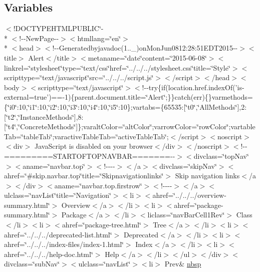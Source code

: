 \subsection*{Variables}
\begin{DoxyCompactItemize}
\item 
$<$!D\-O\-C\-T\-Y\-P\-E\-H\-T\-M\-L\-P\-U\-B\-L\-I\-C\char`\"{}-\/\\*
$<$!-\/-\/New\-Page-\/-\/$>$$<$htmllang=\char`\"{}en\char`\"{}$>$\\*
$<$head$>$$<$!-\/-\/Generatedbyjavadoc(1..\-\_)on\-Mon\-Jun0812\-:28\-:51\-E\-D\-T2015-\/-\/$>$$<$title$>$ Alert$<$/title$>$$<$metaname=\char`\"{}date\char`\"{}content=\char`\"{}2015-\/06-\/08\char`\"{}$>$$<$linkrel=\char`\"{}stylesheet\char`\"{}type=\char`\"{}text/css\char`\"{}href=\char`\"{}../../../stylesheet.\-css\char`\"{}title=\char`\"{}\-Style\char`\"{}$>$$<$scripttype=\char`\"{}text/javascript\char`\"{}src=\char`\"{}../../../script.\-js\char`\"{}$>$$<$/script$>$$<$/head$>$$<$body$>$$<$scripttype=\char`\"{}text/javascript\char`\"{}$>$$<$!-\/-\/try\{if(location.\-href.\-index\-Of('is-\/external=true')==-\/1)\{parent.\-document.\-title=\char`\"{}\-Alert\char`\"{};\}\}catch(err)\{\}varmethods=\{\char`\"{}i0\char`\"{}\-:10,\char`\"{}i1\char`\"{}\-:10,\char`\"{}i2\char`\"{}\-:10,\char`\"{}i3\char`\"{}\-:10,\char`\"{}i4\char`\"{}\-:10,\char`\"{}i5\char`\"{}\-:10\};vartabs=\{65535\-:\mbox{[}\char`\"{}t0\char`\"{},\char`\"{}\-All\-Methods\char`\"{}\mbox{]},2\-:\mbox{[}\char`\"{}t2\char`\"{},\char`\"{}\-Instance\-Methods\char`\"{}\mbox{]},8\-:\mbox{[}\char`\"{}t4\char`\"{},\char`\"{}\-Concrete\-Methods\char`\"{}\mbox{]}\};varalt\-Color=\char`\"{}alt\-Color\char`\"{};varrow\-Color=\char`\"{}row\-Color\char`\"{};vartable\-Tab=\char`\"{}table\-Tab\char`\"{};varactive\-Table\-Tab=\char`\"{}active\-Table\-Tab\char`\"{};$<$/script$>$$<$noscript$>$$<$div$>$ Java\-Script is disabled on your browser$<$/div$>$$<$/noscript$>$$<$!-\/-\/=========\-S\-T\-A\-R\-T\-O\-F\-T\-O\-P\-N\-A\-V\-B\-A\-R=======-\/-\/$>$$<$divclass=\char`\"{}top\-Nav\char`\"{}$>$$<$aname=\char`\"{}navbar.\-top\char`\"{}$>$$<$!-\/-\/-\/-\/$>$$<$/a$>$$<$divclass=\char`\"{}skip\-Nav\char`\"{}$>$$<$ahref=\char`\"{}\#skip.\-navbar.\-top\char`\"{}title=\char`\"{}\-Skipnavigationlinks\char`\"{}$>$ Skip navigation links$<$/a$>$$<$/div$>$$<$aname=\char`\"{}navbar.\-top.\-firstrow\char`\"{}$>$$<$!-\/-\/-\/-\/$>$$<$/a$>$$<$ulclass=\char`\"{}nav\-List\char`\"{}title=\char`\"{}\-Navigation\char`\"{}$>$$<$li$>$$<$ahref=\char`\"{}../../../overview-\/summary.\-html\char`\"{}$>$ Overview$<$/a$>$$<$/li$>$$<$li$>$$<$ahref=\char`\"{}package-\/summary.\-html\char`\"{}$>$ Package$<$/a$>$$<$/li$>$$<$liclass=\char`\"{}nav\-Bar\-Cell1\-Rev\char`\"{}$>$ Class$<$/li$>$$<$li$>$$<$ahref=\char`\"{}package-\/tree.\-html\char`\"{}$>$ Tree$<$/a$>$$<$/li$>$$<$li$>$$<$ahref=\char`\"{}../../../deprecated-\/list.\-html\char`\"{}$>$ Deprecated$<$/a$>$$<$/li$>$$<$li$>$$<$ahref=\char`\"{}../../../index-\/files/index-\/1.\-html\char`\"{}$>$ Index$<$/a$>$$<$/li$>$$<$li$>$$<$ahref=\char`\"{}../../../help-\/doc.\-html\char`\"{}$>$ Help$<$/a$>$$<$/li$>$$<$/ul$>$$<$/div$>$$<$divclass=\char`\"{}sub\-Nav\char`\"{}$>$$<$ulclass=\char`\"{}nav\-List\char`\"{}$>$$<$li$>$ Prev\& \hyperlink{_alert_8html_aef915316f784c9063d942974538301a6}{nbsp}

\end{DoxyCompactItemize}
